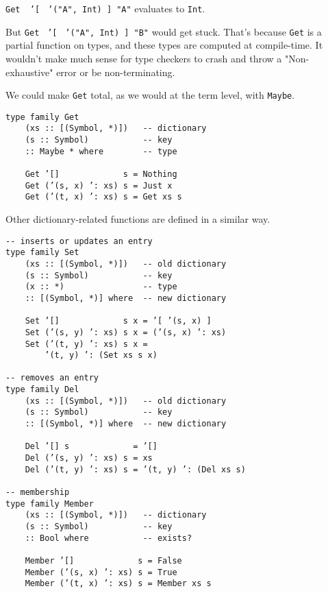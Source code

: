 \documentclass[pldi]{sigplanconf-pldi16}
\begin{document}
\texttt{Get }\texttt{ '}\texttt{[ }
\texttt{'}\texttt{("A", Int) ] "A"} evaluates to
\texttt{Int}.

But \texttt{Get }
\texttt{'}\texttt{[ }
\texttt{'}\texttt{("A", Int) ] "B"} would get stuck.
That's because \texttt{Get} is a partial function on types,
 and these types are computed at compile-time. It wouldn't make
much sense for type checkers to crash and throw a "Non-exhaustive" error or
be non-terminating.

We could make \texttt{Get} total, as we would at the term level,
with \texttt{Maybe}.

\begin{verbatim}
type family Get
    (xs :: [(Symbol, *)])   -- dictionary
    (s :: Symbol)           -- key
    :: Maybe * where        -- type

    Get ’[]             s = Nothing
    Get (’(s, x) ’: xs) s = Just x
    Get (’(t, x) ’: xs) s = Get xs s
\end{verbatim}

Other dictionary-related functions are defined in a similar way.

\begin{verbatim}
-- inserts or updates an entry
type family Set
    (xs :: [(Symbol, *)])   -- old dictionary
    (s :: Symbol)           -- key
    (x :: *)                -- type
    :: [(Symbol, *)] where  -- new dictionary

    Set ’[]             s x = ’[ ’(s, x) ]
    Set (’(s, y) ’: xs) s x = (’(s, x) ’: xs)
    Set (’(t, y) ’: xs) s x =
        ’(t, y) ’: (Set xs s x)

-- removes an entry
type family Del
    (xs :: [(Symbol, *)])   -- old dictionary
    (s :: Symbol)           -- key
    :: [(Symbol, *)] where  -- new dictionary

    Del ’[] s             = ’[]
    Del (’(s, y) ’: xs) s = xs
    Del (’(t, y) ’: xs) s = ’(t, y) ’: (Del xs s)

-- membership
type family Member
    (xs :: [(Symbol, *)])   -- dictionary
    (s :: Symbol)           -- key
    :: Bool where           -- exists?

    Member ’[]             s = False
    Member (’(s, x) ’: xs) s = True
    Member (’(t, x) ’: xs) s = Member xs s
\end{verbatim}
\end{document}
